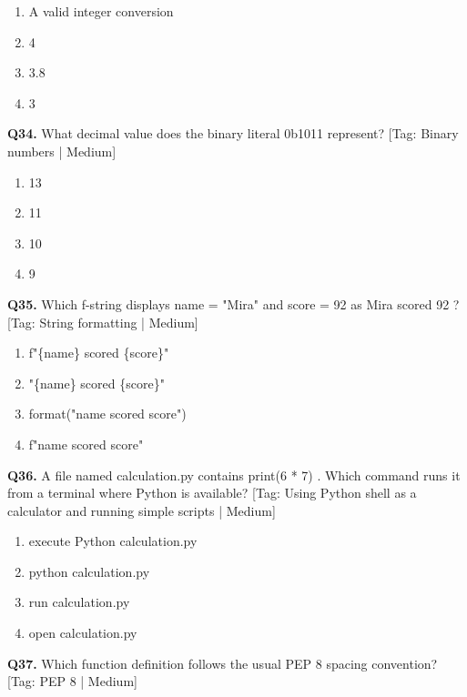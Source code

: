\begin{enumerate}[label=(\alph*),topsep=2pt,itemsep=1pt,partopsep=0pt,parsep=0pt]
    \item {A valid integer conversion}
    \item {4}
    \item {3.8}
    \item {3}
\end{enumerate}
\vspace{2mm}
\noindent\textbf{Q34.} What decimal value does the binary literal 0b1011 represent? \hfill [Tag: Binary numbers | Medium]
\begin{enumerate}[label=(\alph*),topsep=2pt,itemsep=1pt,partopsep=0pt,parsep=0pt]
    \item {13}
    \item {11}
    \item {10}
    \item {9}
\end{enumerate}
\vspace{2mm}
\noindent\textbf{Q35.} Which f-string displays name = "Mira" and score = 92 as Mira scored 92 ? \hfill [Tag: String formatting | Medium]
\begin{enumerate}[label=(\alph*),topsep=2pt,itemsep=1pt,partopsep=0pt,parsep=0pt]
    \item {f"\{name\} scored \{score\}"}
    \item {"\{name\} scored \{score\}"}
    \item {format("name scored score")}
    \item {f"name scored score"}
\end{enumerate}
\vspace{2mm}
\noindent\textbf{Q36.} A file named calculation.py contains print(6 * 7) . Which command runs it from a terminal where Python is available? \hfill [Tag: Using Python shell as a calculator and running simple scripts | Medium]
\begin{enumerate}[label=(\alph*),topsep=2pt,itemsep=1pt,partopsep=0pt,parsep=0pt]
    \item {execute Python calculation.py}
    \item {python calculation.py}
    \item {run calculation.py}
    \item {open calculation.py}
\end{enumerate}
\vspace{2mm}
\noindent\textbf{Q37.} Which function definition follows the usual PEP 8 spacing convention? \hfill [Tag: PEP 8 | Medium]
